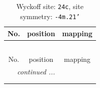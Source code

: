 \documentclass[fleqn,8pt]{jsarticle}
\begin{document}
\renewcommand{\arraystretch}{1.2}
\begin{longtable}{ccc}
\caption{Wyckoff site: {\tt 24c}, site symmetry: {\tt -4m.21'}}
 \\
 \hline \hline
No. & position & mapping \\ \hline \endfirsthead

\multicolumn{2}{l}{\tablename\ \thetable{}} \\
 \hline \hline
No. & position & mapping \\ \hline \endhead

 \hline \hline
\multicolumn{2}{r}{\footnotesize\it continued ...} \\ \endfoot

 \hline \hline
\multicolumn{2}{r}{} \\ \endlastfoot


\end{longtable}
\end{document}
